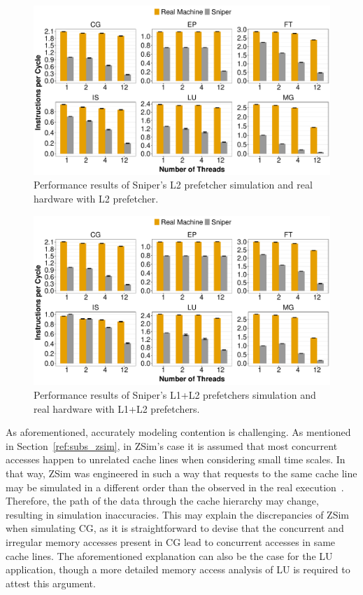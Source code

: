 \documentclass[AMA,final,STIX1COL]{WileyNJD-v2}
\begin{document}
\begin{figure}[b]
    \centering
    \includegraphics[width=\linewidth]{figures/fig9.pdf}
    \caption{Performance results of Sniper's L2 prefetcher simulation and real hardware with L2 prefetcher.}
    \label{fig:sniper_l2}
\end{figure}


\begin{figure}[b]
    \centering
    \includegraphics[width=\linewidth]{figures/fig10.pdf}
    \caption{Performance results of Sniper's L1+L2 prefetchers simulation and real hardware with L1+L2 prefetchers.}
    \label{fig:sniper_l1l2}
\end{figure}

As aforementioned, accurately modeling contention is challenging. 
As mentioned in Section~\ref{ref:subs_zsim}, in ZSim's case it is assumed that most concurrent accesses happen to unrelated cache lines when considering small time scales. 
In that way, ZSim was engineered in such a way that requests to the same cache line may be simulated in a different order than the observed in the real execution~\cite{sanchez2013zsim}.
Therefore, the path of the data through the cache hierarchy may change, resulting in simulation inaccuracies.
This may explain the discrepancies of ZSim when simulating CG, as it is straightforward to devise that the concurrent and irregular memory accesses present in CG lead to concurrent accesses in same cache lines.
The aforementioned explanation can also be the case for the LU application, though a more detailed memory access analysis of LU is required to attest this argument.
\end{document}
